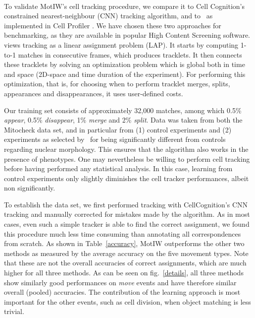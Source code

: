 \paragraph*{}
To validate MotIW's cell tracking procedure, we compare it to Cell Cognition's constrained nearest-neighbour (CNN) tracking algorithm, and to~\cite{jaqaman} as implemented in Cell Profiler \cite{Carpenter2006}. We have chosen these two approaches for benchmarking, as they are available in popular High Content Screening software. \cite{jaqaman} views tracking as a linear assignment problem (LAP). It starts by computing 1-to-1 matches in consecutive frames, which produces tracklets. It then connects these tracklets by solving an optimization problem which is global both in time and space (2D-space and time duration of the experiment). For performing this optimization, that is, for choosing when to perform tracklet merges, splits, appearances and disappearances, it uses user-defined costs. 

Our training set consists of approximately 32,000 matches, among which
0.5\% \textit{appear}, 0.5\% \textit{disappear}, 1\% \textit{merge}
and 2\% \textit{split}. Data was taken from both the Mitocheck data
set, and in particular from (1) control experiments and (2)
experiments as selected by~\cite{pmid20360735} for being significantly
different from controls regarding nuclear morphology. This ensures
that the algorithm also works in the presence of phenotypes. One may
nevertheless be willing to perform cell tracking before having
performed any statistical analysis. In this case, learning from
control experiments only slightly diminishes the cell tracker
performances, albeit non significantly. 

To establish the data set, we first performed tracking with
CellCognition's CNN tracking and manually corrected for mistakes made
by the algorithm. As in most cases, even such a simple tracker is able
to find the correct assignment, we found this procedure much less time
consuming than annotating all correspondences from scratch. 
As shown in Table~\ref{accuracy}, MotIW outperforms the other two
methods as measured by the average accuracy on the five movement
types. Note that these are not the overall accuracies of correct
assignments, which are much higher for all three methods. 
As can be seen on fig.~\ref{details}, all three methods show similarly good
performances on \textit{move} events and have therefore similar
overall (pooled) accuracies. The contribution of the learning approach
is most important for the other events, such as cell division, when
object matching is less trivial. 

